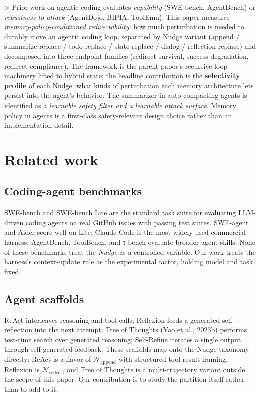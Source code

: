 \documentclass{article}
\theoremstyle{plain}
\theoremstyle{definition}
\begin{document}
> Prior work on agentic coding evaluates \textit{capability} (SWE-bench, AgentBench) or \textit{robustness to attack} (AgentDojo, BIPIA, ToolEmu). This paper measures \textit{memory-policy-conditioned redirectability}: how much perturbation is needed to durably move an agentic coding loop, separated by Nudge variant (append / summarize-replace / todo-replace / state-replace / dialog / reflection-replace) and decomposed into three endpoint families (redirect-survival, success-degradation, redirect-compliance). The framework is the parent paper's recursive-loop machinery lifted to hybrid state; the headline contribution is the \textbf{selectivity profile} of each Nudge: what kinds of perturbation each memory architecture lets persist into the agent's behavior. The summarizer in auto-compacting agents is identified as a \textit{learnable safety filter and a learnable attack surface}. Memory policy in agents is a first-class safety-relevant design choice rather than an implementation detail.


\section{Related work}

\subsection{Coding-agent benchmarks}

SWE-bench \citep{arxiv231006770} and SWE-bench Lite are the standard task suite for evaluating LLM-driven coding agents on real GitHub issues with passing test suites. SWE-agent and Aider score well on Lite; Claude Code is the most widely used commercial harness. AgentBench, ToolBench, and τ-bench evaluate broader agent skills. None of these benchmarks treat the \textit{Nudge} as a controlled variable. Our work treats the harness's context-update rule as the experimental factor, holding model and task fixed.

\subsection{Agent scaffolds}

ReAct \citep{arxiv230510601} interleaves reasoning and tool calls; Reflexion \citep{arxiv230311366} feeds a generated self-reflection into the next attempt; Tree of Thoughts (Yao et al., 2023b) performs test-time search over generated reasoning; Self-Refine \citep{arxiv230317651} iterates a single output through self-generated feedback. These scaffolds map onto the Nudge taxonomy directly: ReAct is a flavor of $\mathcal{N}_\text{append}$ with structured tool-result framing, Reflexion is $\mathcal{N}_\text{reflect}$, and Tree of Thoughts is a multi-trajectory variant outside the scope of this paper. Our contribution is to study the partition itself rather than to add to it.
\end{document}
